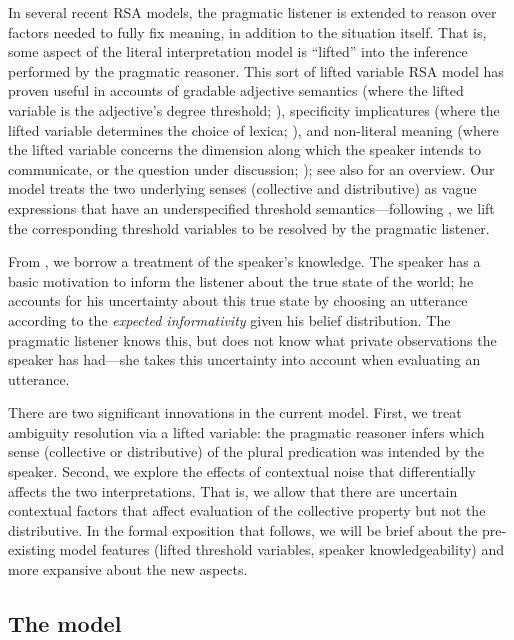 \documentclass[preprint,12pt,authoryear,titlepage]{elsarticle}
\begin{document}
In several recent RSA models, the pragmatic listener is extended to reason over factors needed to fully fix meaning, in addition to the situation itself. 
That is, some aspect of the literal interpretation model is ``lifted'' into the inference performed by the pragmatic reasoner.
This sort of lifted variable RSA model has proven useful in accounts of gradable adjective semantics (where the lifted variable is the adjective's degree threshold; \citealp{lassitergoodman2013}), specificity implicatures (where the lifted variable determines the choice of lexica; \citealp{bergenetal2012}), and non-literal meaning (where the lifted variable concerns the dimension along which the speaker intends to communicate, or the question under discussion; \citealp{kaoetal2014}); see also \citealp{goodmanlassiter2015} for an overview. Our model treats the two underlying senses (collective and distributive) as vague expressions that have an underspecified threshold semantics---following \citealp{lassitergoodman2013}, we lift the corresponding threshold variables to be resolved by the pragmatic listener.

From \citealp{goodmanstuhlmuller2013}, we borrow a treatment of the speaker's knowledge. The speaker has a basic motivation to inform the listener about the true state of the world; he accounts for his uncertainty about this true state by choosing an utterance according to the \emph{expected informativity} given his belief distribution. The pragmatic listener knows this, but does not know what private observations the speaker has had---she takes this uncertainty into account when evaluating an utterance.

There are two significant innovations in the current model. First, we treat ambiguity resolution via a lifted variable: the pragmatic reasoner infers which sense (collective or distributive) of the plural predication was intended by the speaker. Second, we explore the effects of contextual noise that differentially affects the two interpretations. That is, we allow that there are uncertain contextual factors that affect evaluation of the collective property but not the distributive. 
In the formal exposition that follows, we will be brief about the pre-existing model features (lifted threshold variables, speaker knowledgeability) and more expansive about the new aspects.

\subsection{The model}
\end{document}

